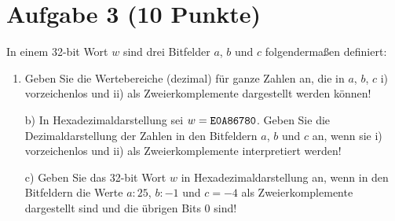 \section*{Aufgabe 3 (10 Punkte)}

In einem 32-bit Wort $w$ sind drei Bitfelder $a$, $b$ und $c$ folgendermaßen definiert:

\begin{table}[h]
\centering
{}
\end{table}

\begin{enumerate}[label={a)}, leftmargin=*]
\item Geben Sie die Wertebereiche (dezimal) für ganze Zahlen an, die in $a$, $b$, $c$  i) vorzeichenlos und ii) als Zweierkomplemente dargestellt werden können!
\item[b)] In Hexadezimaldarstellung sei $w = \text{\texttt{E0A86780}}$. Geben Sie die Dezimaldarstellung der Zahlen in den Bitfeldern $a$, $b$ und $c$ an, wenn sie i) vorzeichenlos und ii) als Zweierkomplemente interpretiert werden!
\item[c)] Geben Sie das 32-bit Wort $w$ in Hexadezimaldarstellung an, wenn in den Bitfeldern die Werte $a : 25$, $b : -1$ und $c = -4$ als Zweierkomplemente dargestellt sind und die übrigen Bits 0 sind!
\end{enumerate}

\newpage